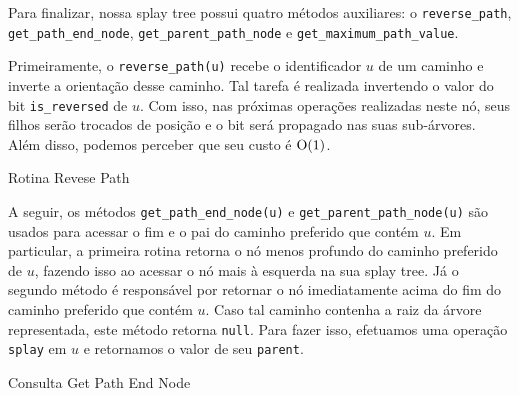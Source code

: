 Para finalizar, nossa splay tree possui quatro métodos auxiliares: o \texttt{reverse\_path}, \texttt{get\_path\_end\_node}, \texttt{get\_parent\_path\_node} e \texttt{get\_maximum\_path\_value}.

Primeiramente, o \texttt{reverse\_path(u)} recebe o identificador $u$ de um caminho e inverte a orientação desse caminho. Tal tarefa é realizada invertendo o valor do bit \texttt{is\_reversed} de $u$. Com isso, nas próximas operações realizadas neste nó, seus filhos serão trocados de posição e o bit será propagado nas suas sub-árvores. Além disso, podemos perceber que seu custo é $\mathrm{O}(1)$.

\begin{algorithm}[h!]
    \caption{Rotina Revese Path}\label{splay:reverse-path}
    \begin{algorithmic}[1]
        \EndFunction
    \end{algorithmic}
\end{algorithm}

A seguir, os métodos \texttt{get\_path\_end\_node(u)} e \texttt{get\_parent\_path\_node(u)} são usados para acessar o fim e o pai do caminho preferido que contém $u$. Em particular, a primeira rotina retorna o nó menos profundo do caminho preferido de $u$, fazendo isso ao acessar o nó mais à esquerda na sua splay tree. Já o segundo método é responsável por retornar o nó imediatamente acima do fim do caminho preferido que contém $u$. Caso tal caminho contenha a raiz da árvore representada, este método retorna \texttt{null}. Para fazer isso, efetuamos uma operação \texttt{splay} em $u$ e retornamos o valor de seu \texttt{parent}.

\begin{algorithm}[h!]
    \caption{Consulta Get Path End Node}\label{splay:get-path-end}
    \begin{algorithmic}[1]
        \EndWhile
        \State {}
        \EndFunction
    \end{algorithmic}
\end{algorithm}


